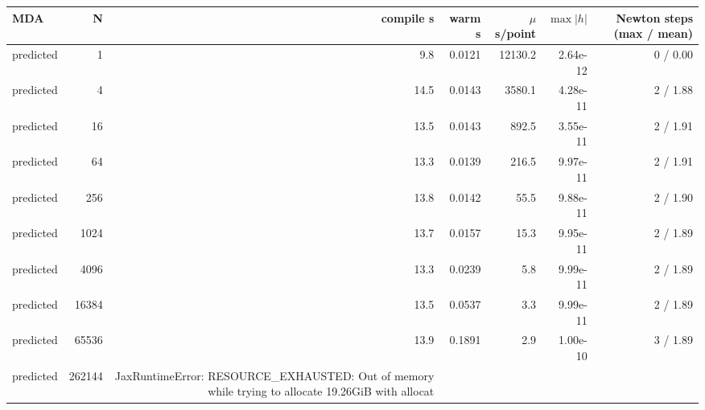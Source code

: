 \begin{tabular}{lrrrrrr}
\toprule
MDA & N & compile s & warm s & $\mu$s/point & $\max|h|$ & Newton steps (max / mean) \\
\midrule
predicted & 1 & 9.8 & 0.0121 & 12130.2 & 2.64e-12 & 0 / 0.00 \\
predicted & 4 & 14.5 & 0.0143 & 3580.1 & 4.28e-11 & 2 / 1.88 \\
predicted & 16 & 13.5 & 0.0143 & 892.5 & 3.55e-11 & 2 / 1.91 \\
predicted & 64 & 13.3 & 0.0139 & 216.5 & 9.97e-11 & 2 / 1.91 \\
predicted & 256 & 13.8 & 0.0142 & 55.5 & 9.88e-11 & 2 / 1.90 \\
predicted & 1024 & 13.7 & 0.0157 & 15.3 & 9.95e-11 & 2 / 1.89 \\
predicted & 4096 & 13.3 & 0.0239 & 5.8 & 9.99e-11 & 2 / 1.89 \\
predicted & 16384 & 13.5 & 0.0537 & 3.3 & 9.99e-11 & 2 / 1.89 \\
predicted & 65536 & 13.9 & 0.1891 & 2.9 & 1.00e-10 & 3 / 1.89 \\
predicted & 262144 & JaxRuntimeError: RESOURCE_EXHAUSTED: Out of memory while trying to allocate 19.26GiB with allocat &  &  &  &  \\
\bottomrule
\end{tabular}
